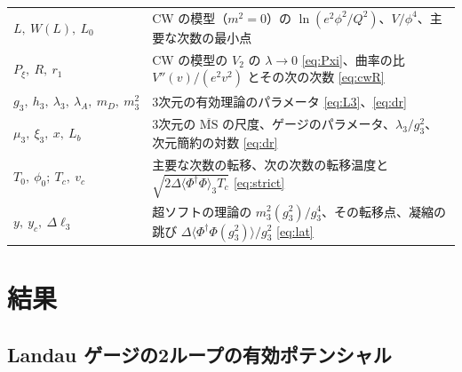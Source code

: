 \documentclass[a4paper,10pt]{ltjsarticle}
\newcommand{\MSbar}{\overline{\mathrm{MS}}}
\begin{document}
\begin{table}[tbp]
\begin{tabularx}{\linewidth}{>{\raggedright\arraybackslash}p{4.2cm}X}
$L,\ W(L),\ L_0$ & CW の模型（$m^2=0$）の $\ln(e^2\phi^2/Q^2)$、$V/\phi^4$、主要な次数の最小点 \\
$P_\xi,\ R,\ r_1$ & CW の模型の $V_2$ の $\lambda\to0$ \eqref{eq:Pxi}、曲率の比 $V''(v)/(e^2v^2)$ とその次の次数 \eqref{eq:cwR} \\
$g_3,\ h_3,\ \lambda_3,\ \lambda_A,\ m_D,\ m_3^2$ & 3次元の有効理論のパラメータ \eqref{eq:L3}、\eqref{eq:dr} \\
$\mu_3,\ \xi_3,\ x,\ L_b$ & 3次元の $\MSbar$ の尺度、ゲージのパラメータ、$\lambda_3/g_3^2$、次元簡約の対数 \eqref{eq:dr} \\
$T_0,\ \phi_0;\ T_c,\ v_c$ & 主要な次数の転移、次の次数の転移温度と $\sqrt{2\Delta\langle\Phi^\dagger\Phi\rangle_3T_c}$ \eqref{eq:strict} \\
$y,\ y_c,\ \Delta\ell_3$ & 超ソフトの理論の $m_3^2(g_3^2)/g_3^4$、その転移点、凝縮の跳び $\Delta\langle\Phi^\dagger\Phi(g_3^2)\rangle/g_3^2$ \eqref{eq:lat} \\
\bottomrule
\end{tabularx}
\end{table}

\section{結果}\label{sec:results}

\subsection{Landau ゲージの2ループの有効ポテンシャル}\label{sec:landau}
\end{document}
